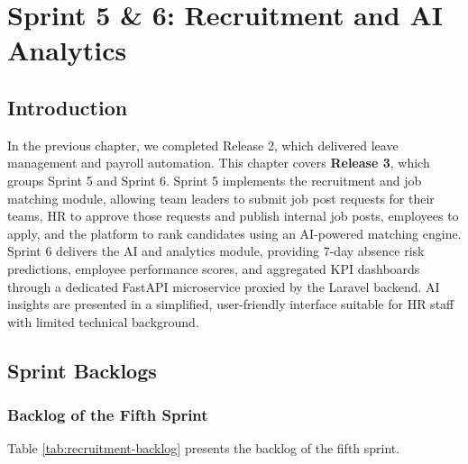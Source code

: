 \chapter{Sprint 5 \& 6: Recruitment and AI Analytics}

\section*{Introduction}
In the previous chapter, we completed Release 2, which delivered leave management and payroll automation. This chapter covers \textbf{Release 3}, which groups Sprint 5 and Sprint 6. Sprint 5 implements the recruitment and job matching module, allowing team leaders to submit job post requests for their teams, HR to approve those requests and publish internal job posts, employees to apply, and the platform to rank candidates using an AI-powered matching engine. Sprint 6 delivers the AI and analytics module, providing 7-day absence risk predictions, employee performance scores, and aggregated KPI dashboards through a dedicated FastAPI microservice proxied by the Laravel backend. AI insights are presented in a simplified, user-friendly interface suitable for HR staff with limited technical background.

\section{Sprint Backlogs}

\subsection{Backlog of the Fifth Sprint}
Table \ref{tab:recruitment-backlog} presents the backlog of the fifth sprint.

